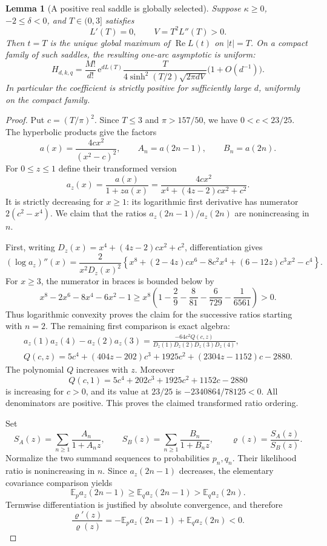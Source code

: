 \documentclass[11pt,a4paper]{article}
\numberwithin{equation}{section}
\newtheorem{lemma}[theorem]{Lemma}
\begin{document}
\begin{lemma}[A positive real saddle is globally selected]\label{aud:gh:angularselection}
Suppose $\kappa\ge0$, $-2\le\delta<0$, and $T\in(0,3]$ satisfies
\[
 L'(T)=0,\qquad V=T^2L''(T)>0.
\]
Then $t=T$ is the unique global maximum of $\operatorname{Re}L(t)$ on
$|t|=T$.  On a compact family of such saddles, the resulting one-arc
asymptotic is uniform:
\begin{equation}\label{aud:gh:realasymptotic}
 H_{d,k,q}=
 \frac{M!}{d!}\,\mathrm e^{dL(T)}
 \frac{T}{4\sinh^2(T/2)\sqrt{2\pi dV}}
 \bigl(1+O(d^{-1})\bigr).
\end{equation}
In particular the coefficient is strictly positive for sufficiently large
$d$, uniformly on the compact family.
\end{lemma}
\begin{proof}
Put $c=(T/\pi)^2$.  Since $T\le3$ and $\pi>157/50$, we have $0<c<23/25$.
The hyperbolic products give the factors
\[
 a(x)=\frac{4cx^2}{(x^2-c)^2},\qquad
 A_n=a(2n-1),\qquad B_n=a(2n).
\]
For $0\le z\le1$ define their transformed version
\[
 a_z(x)=\frac{a(x)}{1+za(x)}
       =\frac{4cx^2}{x^4+(4z-2)cx^2+c^2}.
\]
It is strictly decreasing for $x\ge1$: its logarithmic first derivative
has numerator $2(c^2-x^4)$.  We claim that the ratios
$a_z(2n-1)/a_z(2n)$ are nonincreasing in $n$.

First, writing $D_z(x)=x^4+(4z-2)cx^2+c^2$, differentiation gives
\[
 (\log a_z)''(x)=\frac{2}{x^2D_z(x)^2}
 \left\{x^8+(2-4z)cx^6-8c^2x^4+(6-12z)c^3x^2-c^4\right\}.
\]
For $x\ge3$, the numerator in braces is bounded below by
\[
 x^8-2x^6-8x^4-6x^2-1
 \ge x^8\left(1-\frac29-\frac8{81}-\frac6{729}-\frac1{6561}\right)>0.
\]
Thus logarithmic convexity proves the claim for the successive ratios
starting with $n=2$.  The remaining first comparison is exact algebra:
\begin{gather*}
 a_z(1)a_z(4)-a_z(2)a_z(3)
 =\frac{-64c^2Q(c,z)}{D_z(1)D_z(2)D_z(3)D_z(4)},\\
 Q(c,z)=5c^4+(404z-202)c^3+1925c^2+(2304z-1152)c-2880.
\end{gather*}
The polynomial $Q$ increases with $z$.  Moreover
\[
 Q(c,1)=5c^4+202c^3+1925c^2+1152c-2880
\]
is increasing for $c>0$, and its value at $23/25$ is
$-2340864/78125<0$.  All denominators are positive.  This proves the
claimed transformed ratio ordering.

Set
\[
 S_A(z)=\sum_{n\ge1}\frac{A_n}{1+A_nz},\qquad
 S_B(z)=\sum_{n\ge1}\frac{B_n}{1+B_nz},\qquad \varrho(z)=\frac{S_A(z)}{S_B(z)}.
\]
Normalize the two summand sequences to probabilities $p_n,q_n$.  Their
likelihood ratio is nonincreasing in $n$.  Since $a_z(2n-1)$ decreases,
the elementary covariance comparison yields
\[
 \mathbb E_p a_z(2n-1)\ge\mathbb E_q a_z(2n-1)
                       >\mathbb E_q a_z(2n).
\]
Termwise differentiation is justified by absolute convergence, and therefore
\begin{equation}\label{aud:gh:Rdecreases}
 \frac{\varrho'(z)}{\varrho(z)}
 =-\mathbb E_p a_z(2n-1)+\mathbb E_q a_z(2n)<0.
\end{equation}


\end{proof}
\end{document}
